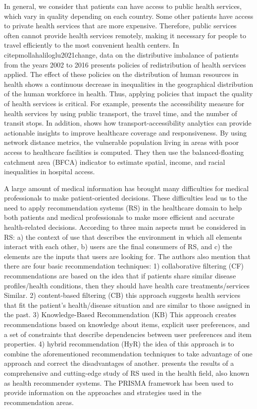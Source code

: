 \documentclass[sustainability,article,submit,pdftex,moreauthors]{Definitions/mdpi}
\begin{document}
In general, we consider that patients can have access to public health services, which vary in quality depending on each country. Some other patients have access to private health services that are more expensive. Therefore, public services often cannot provide health services remotely, making it necessary for people to travel efficiently to the most convenient health centers. In citep{mollahaliloglu2021change}, data on the distributive imbalance of patients from the years 2002 to 2016 presents policies of redistribution of health services applied. The effect of these policies on the distribution of human resources in health shows a continuous decrease in inequalities in the geographical distribution of the human workforce in health. Thus, applying policies that impact the quality of health services is critical. For example, \citet{sharma2021public} presents the accessibility measure for health services by using public transport, the travel time, and the number of transit stops. In addition, \citet{PEREIRA2021113773} shows how transport-accessibility analytics can provide actionable insights to improve healthcare coverage and responsiveness. By using network distance metrics, the vulnerable population living in areas with poor access to healthcare facilities is computed. They then use the balanced-floating catchment area (BFCA) indicator to estimate spatial, income, and racial inequalities in hospital access.

A large amount of medical information has brought many difficulties for medical professionals to make patient-oriented decisions. These difficulties lead us to the need to apply recommendation systems (RS) in the healthcare domain to help both patients and medical professionals to make more efficient and accurate health-related decisions. According to \citet{tran2021recommender} three main aspects must be considered in RS: a) the context of use that describes the environment in which all elements interact with each other, b) users are the final consumers of RS, and c) the elements are the inputs that users are looking for. The authors also mention that there are four basic recommendation techniques: 1) collaborative filtering (CF) recommendations are based on the idea that if patients share similar disease profiles/health conditions, then they should have health care treatments/services Similar. 2) content-based filtering (CB) this approach suggests health services that fit the patient's health/disease situation and are similar to those assigned in the past. 3) Knowledge-Based Recommendation (KB) This approach creates recommendations based on knowledge about items, explicit user preferences, and a set of constraints that describe dependencies between user preferences and item properties. 4) hybrid recommendation (HyR) the idea of this approach is to combine the aforementioned recommendation techniques to take advantage of one approach and correct the disadvantages of another. \citet{pincay2019health} presents the results of a comprehensive and cutting-edge study of RS used in the health field, also known as health recommender systems. The PRISMA framework has been used to provide information on the approaches and strategies used in the recommendation areas.
\end{document}
